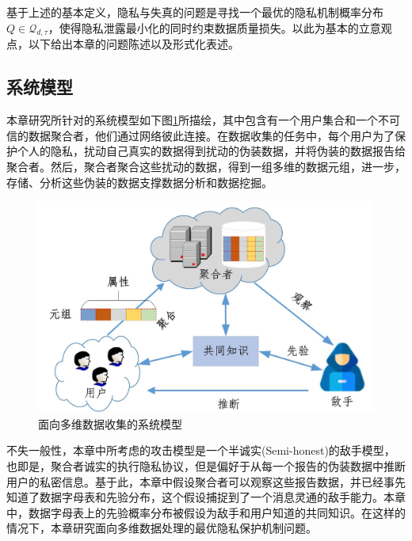基于上述的基本定义，隐私与失真的问题是寻找一个最优的隐私机制概率分布$Q \in \mathcal{Q}_{d,\tau}$，使得隐私泄露最小化的同时约束数据质量损失。以此为基本的立意观点，以下给出本章的问题陈述以及形式化表述。

\subsection{系统模型}\label{subsec:system_model}
本章研究所针对的系统模型如下图\ref{fig:chapter06_Fig01}所描绘，其中包含有一个用户集合和一个不可信的数据聚合者，他们通过网络彼此连接。在数据收集的任务中，每个用户为了保护个人的隐私，扰动自己真实的数据得到扰动的伪装数据，并将伪装的数据报告给聚合者。然后，聚合者聚合这些扰动的数据，得到一组多维的数据元组，进一步，存储、分析这些伪装的数据支撑数据分析和数据挖掘。

\begin{figure}[htbp]
	\centering
	\includegraphics[width = 0.65\linewidth]{./figures/chapter06/chapter06_1.jpg}
	\caption{面向多维数据收集的系统模型}
	\label{fig:chapter06_Fig01}
\end{figure}

不失一般性，本章中所考虑的攻击模型是一个半诚实(Semi-honest)的敌手模型，也即是，聚合者诚实的执行隐私协议，但是偏好于从每一个报告的伪装数据中推断用户的私密信息。基于此，本章中假设聚合者可以观察这些报告数据，并已经事先知道了数据字母表和先验分布，这个假设捕捉到了一个消息灵通的敌手能力。本章中，数据字母表上的先验概率分布被假设为敌手和用户知道的共同知识。在这样的情况下，本章研究面向多维数据处理的最优隐私保护机制问题。

